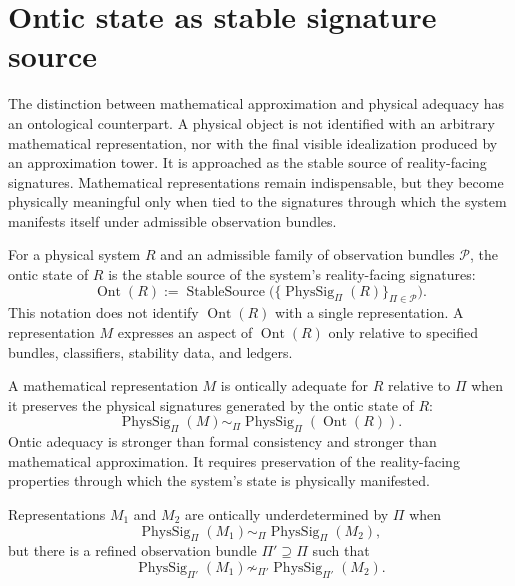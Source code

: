 \section{Ontic state as stable signature source}
\label{sec:ontic-state-stable-signature-source}

The distinction between mathematical approximation and physical adequacy has an ontological counterpart. A physical object is not identified with an arbitrary mathematical representation, nor with the final visible idealization produced by an approximation tower. It is approached as the stable source of reality-facing signatures. Mathematical representations remain indispensable, but they become physically meaningful only when tied to the signatures through which the system manifests itself under admissible observation bundles.

\begin{definition}
\label{def:reality-constrained-ontic-state}
For a physical system $R$ and an admissible family of observation bundles $\mathcal P$, the ontic state of $R$ is the stable source of the system's reality-facing signatures:
$$
\operatorname{Ont}(R)
:=
\operatorname{StableSource}
\bigl(
\{\operatorname{PhysSig}_{\Pi}(R)\}_{\Pi\in\mathcal P}
\bigr).
$$
This notation does not identify $\operatorname{Ont}(R)$ with a single representation. A representation $M$ expresses an aspect of $\operatorname{Ont}(R)$ only relative to specified bundles, classifiers, stability data, and ledgers.
\end{definition}

\begin{definition}
\label{def:ontic-adequacy}
A mathematical representation $M$ is ontically adequate for $R$ relative to $\Pi$ when it preserves the physical signatures generated by the ontic state of $R$:
$$
\operatorname{PhysSig}_{\Pi}(M)
\sim_{\Pi}
\operatorname{PhysSig}_{\Pi}(\operatorname{Ont}(R)).
$$
Ontic adequacy is stronger than formal consistency and stronger than mathematical approximation. It requires preservation of the reality-facing properties through which the system's state is physically manifested.
\end{definition}

\begin{definition}
\label{def:ontic-underdetermination}
Representations $M_1$ and $M_2$ are ontically underdetermined by $\Pi$ when
$$
\operatorname{PhysSig}_{\Pi}(M_1)
\sim_{\Pi}
\operatorname{PhysSig}_{\Pi}(M_2),
$$
but there is a refined observation bundle $\Pi'\supseteq\Pi$ such that
$$
\operatorname{PhysSig}_{\Pi'}(M_1)
\not\sim_{\Pi'}
\operatorname{PhysSig}_{\Pi'}(M_2).
$$
\end{definition}

